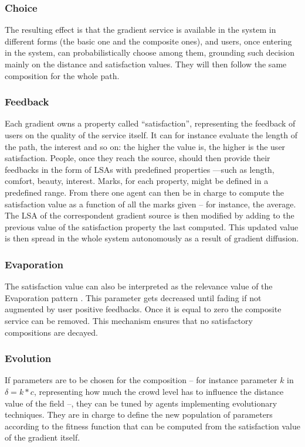 \documentclass[12pt,a4paper,twoside,openright]{book}
\begin{document}
\subsubsection{Choice}
The resulting effect is that the gradient service is available in the system in different forms (the basic one and the composite ones), and users, once entering in the system, can probabilistically choose among them, grounding such decision mainly on the distance and satisfaction values.
%
They will then follow the same composition for the whole path.

\subsubsection{Feedback}
Each gradient owns a property called ``satisfaction'', representing the feedback of users on the quality of the service itself.
%
It can for instance evaluate the length of the path, the interest  and so on: the higher the value is, the higher is the user satisfaction. 
%
People, once they reach the source, should then provide their feedbacks in the form of  LSAs with predefined properties ---such as length, comfort, beauty, interest.
%
Marks, for each property, might be defined in a predefined range. 
%
From there one agent can then be in charge to compute the satisfaction value as a function of all the marks given -- for instance, the average.
%
The LSA of the correspondent gradient source is then modified by adding to the previous value of the satisfaction property the last computed.
%
This updated value is then spread  in the whole system autonomously as a result of gradient diffusion.
 
\subsubsection{Evaporation}
The satisfaction value can also be interpreted as the relevance value of the Evaporation pattern \cite{FDMVA-NACO2012}.
%
This parameter gets decreased until fading if not augmented by user positive feedbacks. Once it is equal to zero the composite service can be removed. This mechanism ensures that no satisfactory compositions are decayed.

\subsubsection{Evolution}
If parameters are to be chosen for the composition -- for instance parameter $k$ in $\delta = k * c$, representing how much the crowd level has to influence the distance value of the field --, they can be tuned by agents implementing evolutionary techniques.
%
They are in charge to define the  new population of parameters according to the fitness function that can be computed from the satisfaction value of the gradient itself.
\end{document}
